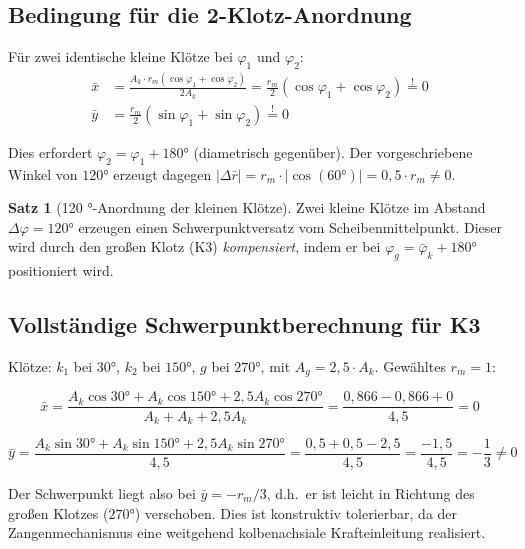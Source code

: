 ﻿\documentclass[12pt,a4paper]{article}
\theoremstyle{definition}
\newtheorem{satz}{Satz}[section]
\begin{document}
\subsection{Bedingung für die 2-Klotz-Anordnung}

Für zwei identische kleine Klötze bei $\varphi_1$ und $\varphi_2$:
\begin{align}
  \bar{x} &= \frac{A_k \cdot r_m (\cos\varphi_1 + \cos\varphi_2)}{2 A_k}
           = \frac{r_m}{2}(\cos\varphi_1 + \cos\varphi_2) \stackrel{!}{=} 0 \\
  \bar{y} &= \frac{r_m}{2}(\sin\varphi_1 + \sin\varphi_2) \stackrel{!}{=} 0
\end{align}

Dies erfordert $\varphi_2 = \varphi_1 + 180 °$ (diametrisch gegenüber).
Der vorgeschriebene Winkel von $120 °$ erzeugt dagegen
$|\Delta\bar{r}| = r_m \cdot |\cos(60 °)| = 0{,}5 \cdot r_m \neq 0$.

\begin{satz}[120 °-Anordnung der kleinen Klötze]
  Zwei kleine Klötze im Abstand $\Delta\varphi = 120 °$ erzeugen einen
  Schwerpunktversatz vom Scheibenmittelpunkt.  Dieser wird durch den
  großen Klotz (K3) \emph{kompensiert}, indem er bei
  $\varphi_g = \bar{\varphi}_k + 180 °$ positioniert wird.
  \label{satz:120}
\end{satz}

\subsection{Vollständige Schwerpunktberechnung für K3}

Klötze: $k_1$ bei $30 °$, $k_2$ bei $150 °$, $g$ bei $270 °$,
mit $A_g = 2{,}5 \cdot A_k$. Gewähltes $r_m = 1$:

\begin{equation}
  \bar{x} = \frac{A_k \cos 30 ° + A_k \cos 150 ° + 2{,}5 A_k \cos 270 °}
                 {A_k + A_k + 2{,}5 A_k}
          = \frac{0{,}866 - 0{,}866 + 0}{4{,}5} = 0
\end{equation}

\begin{equation}
  \bar{y} = \frac{A_k \sin 30 ° + A_k \sin 150 ° + 2{,}5 A_k \sin 270 °}
                 {4{,}5}
          = \frac{0{,}5 + 0{,}5 - 2{,}5}{4{,}5}
          = \frac{-1{,}5}{4{,}5} = -\frac{1}{3} \neq 0
\end{equation}

Der Schwerpunkt liegt also bei $\bar{y} = -r_m/3$, d.h.\ er ist leicht
in Richtung des großen Klotzes ($270 °$) verschoben.  Dies ist
konstruktiv tolerierbar, da der Zangenmechanismus eine weitgehend
kolbenachsiale Krafteinleitung realisiert.
\end{document}
